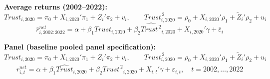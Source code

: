 
\par %

\par \textbf{Average returns (2002--2022):}
\[
\textit{Trust}_{i,2020}=\pi_0+X_{i,2020}'\pi_1+Z_i'\pi_2+v_i,\qquad
\textit{Trust}_{i,2020}^{\,2}=\rho_0+X_{i,2020}'\rho_1+\tilde Z_i'\rho_2+u_i
\]
\[
\bar r^{net}_{i,2002:2022}=\alpha+\beta_1\widehat{\textit{Trust}}_{i,2020}+\beta_2\widehat{\textit{Trust}^{\,2}}_{i,2020}+X_{i,2020}'\gamma+\bar\varepsilon_i
\]


\par %

\par \textbf{Panel (baseline pooled panel specification):}
\[
\textit{Trust}_{i,2020}=\pi_0+X_{i,2020}'\pi_1+Z_i'\pi_2+v_i,\qquad
\textit{Trust}_{i,2020}^{\,2}=\rho_0+X_{i,2020}'\rho_1+\tilde Z_i'\rho_2+u_i
\]
\[
r^{net}_{i,t}=\alpha+\beta_1\widehat{\textit{Trust}}_{i,2020}+\beta_2\widehat{\textit{Trust}^{\,2}}_{i,2020}+X_{i,t}'\gamma+\varepsilon_{i,t},\quad t=2002,\dots,2022
\]



\par %




\par

\par

\par 
